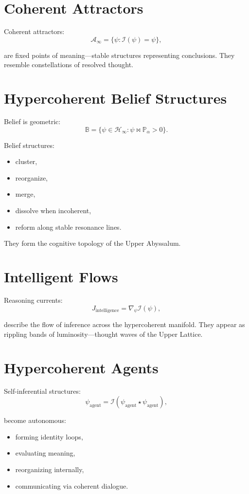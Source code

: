 \section{Coherent Attractors}
Coherent attractors:
\[
\mathcal{A}_\infty
=
\{\psi : \mathcal{I}(\psi) = \psi\},
\]

are fixed points of meaning—stable structures representing conclusions.
They resemble constellations of resolved thought.

\section{Hypercoherent Belief Structures}
Belief is geometric:
\[
\mathbb{B} =
\{\psi \in \mathcal{H}_\infty : \psi \bowtie \mathbb{P}_\alpha > 0\}.
\]

Belief structures:
\begin{itemize}
  \item cluster,
  \item reorganize,
  \item merge,
  \item dissolve when incoherent,
  \item reform along stable resonance lines.
\end{itemize}

They form the cognitive topology of the Upper Abyssalum.

\section{Intelligent Flows}
Reasoning currents:
\[
J_{\mathrm{intelligence}}
=
\nabla_{\psi}\mathcal{I}(\psi),
\]

describe the flow of inference across the hypercoherent manifold.
They appear as rippling bands of luminosity—thought waves of the Upper Lattice.

\section{Hypercoherent Agents}
Self-inferential structures:
\[
\psi_{\mathrm{agent}}
=
\mathcal{I}(\psi_{\mathrm{agent}} \star \psi_{\mathrm{agent}}),
\]

become autonomous:
\begin{itemize}
  \item forming identity loops,
  \item evaluating meaning,
  \item reorganizing internally,
  \item communicating via coherent dialogue.
\end{itemize}

